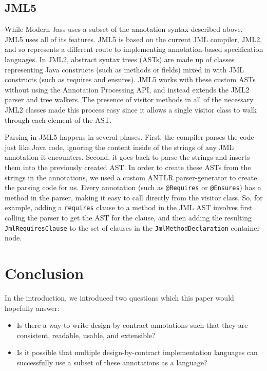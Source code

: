 \documentclass{llncs}
\begin{document}
\subsection{JML5}

While Modern Jass uses a subset of the annotation syntax described above, JML5 uses all of its features.  JML5 is based on the current JML compiler, JML2, and so represents a different route to implementing annotation-based specification languages. In JML2, abstract syntax trees (ASTs) are made up of classes representing Java constructs (such as methods or fields) mixed in with JML constructs (such as requires and ensures).  JML5 works with these custom ASTs without using the Annotation Processing API, and instead extends the JML2 parser and tree walkers.  The presence of visitor methods in all of the necessary JML2 classes made this process easy since it allows a single visitor class to walk through each element of the AST.  

Parsing in JML5 happens in several phases.  First, the compiler parses the code just like Java code, ignoring the content inside of the strings of any JML annotation it encounters.  Second, it goes back to parse the strings and inserts them into the previously created AST.  In order to create these ASTs from the strings in the annotations, we used a custom ANTLR parser-generator \cite{Parr-Quong95} to create the parsing code for us.  Every annotation (such as \lstinline[language={[JML5]Java}]{@Requires} or \lstinline[language={[JML5]Java}]{@Ensures}) has a method in the parser, making it easy to call directly from the visitor class.  So, for example, adding a \lstinline[language={[JML5]Java}]{requires} clause to a method in the JML AST involves first calling the parser to get the AST for the clause, and then adding the resulting \lstinline[language={[JML5]Java}]{JmlRequiresClause} to the set of clauses in the \lstinline[language={[JML5]Java}]{JmlMethodDeclaration} container node.

\section{Conclusion}

In the introduction, we introduced two questions which this paper would hopefully answer:

\begin{itemize}

\item Is there a way to write design-by-contract annotations such that they are consistent, readable, usable, and extensible?

\item Is it possible that multiple design-by-contract implementation languages can successfully use a subset of these annotations as a language?

\end{itemize}
\end{document}
